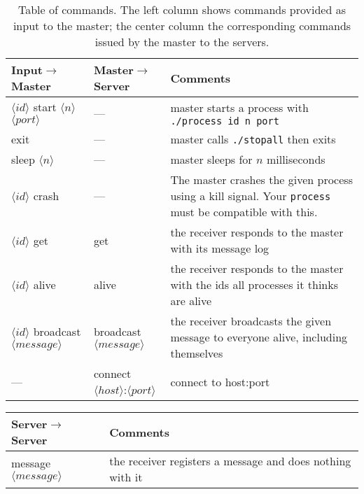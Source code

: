 \documentclass[12pt]{article}
\begin{document}
\begin{table}[!h]
	\centering
	\begin{tabular}{|p{5cm}|p{3.5cm}|p{6.5cm}|}
		\hline
		Input$\to$Master & Master$\to$Server & Comments \\
		\hline
		\hline
		$\langle id\rangle$ start $\langle n\rangle$ $\langle port\rangle$& --- &
		master starts a process with \texttt{./process id n port} \\
		\hline
		exit & --- & master calls \texttt{./stopall} then exits\\
		\hline
		sleep $\langle n \rangle$ & --- & master sleeps for $n$ milliseconds\\
		\hline
		$\langle id\rangle$ crash & --- & The master crashes the given process using a kill signal. Your \texttt{process} must be compatible with this.\\
		\hline
		\hline
		$\langle id\rangle$ get & get & the receiver responds to the master with its message log\\
		\hline
		$\langle id\rangle$ alive & alive & the receiver responds to the master with the ids all processes it thinks are alive\\
		\hline
		$\langle id\rangle$ broadcast $\langle message\rangle$ & broadcast $\langle message\rangle$ & the receiver broadcasts the given message to everyone alive, including themselves\\
		\hline
		--- & connect $\langle host \rangle$:$\langle port \rangle$ & connect to host:port \\
		\hline
	\end{tabular}
	\caption{Table of commands.
		The left column shows commands provided as input to the master;
		the center column the corresponding commands issued by the master to the servers.}
	\label{tab:commands}
\end{table}
\begin{table}[!h]
	\centering
	\begin{tabular}{|p{5cm}|p{6.5cm}|}
		\hline
		Server$\to$Server  & Comments \\
		\hline
		message $\langle message \rangle$ & the receiver registers a message and does nothing with it \\
		\hline
	\end{tabular}
\end{table}
\end{document}

